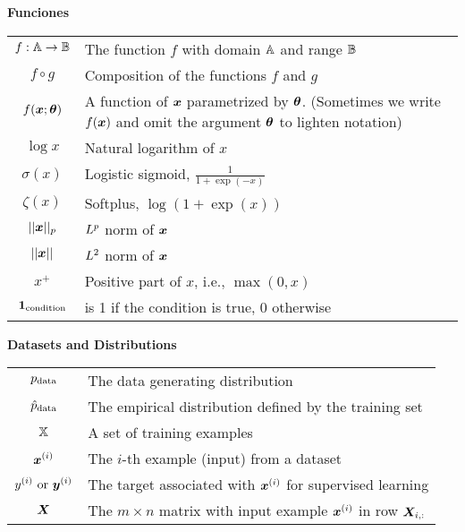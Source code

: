 \vspace{\notationgap}
\begin{minipage}{\textwidth}
\centerline{\bf Funciones}
\bgroup
\def\arraystretch{1.5}
\begin{tabular}{cp{}}
$\displaystyle f: {\mathbb{A}} \rightarrow {\mathbb{B}}$ & The function $f$ with domain ${\mathbb{A}}$ and range ${\mathbb{B}}$\\
$\displaystyle f \circ g $ & Composition of the functions $f$ and $g$ \\
  $\displaystyle f({\bm{x}} ; {\bm{\theta}}) $ & A function of ${\bm{x}}$ parametrized by ${\bm{\theta}}$.
  (Sometimes we write $f({\bm{x}})$ and omit the argument ${\bm{\theta}}$ to lighten notation) \\
$\displaystyle \log x$ & Natural logarithm of $x$ \\
$\displaystyle \sigma(x)$ & Logistic sigmoid, $\displaystyle \frac{1} {1 + \exp(-x)}$ \\
$\displaystyle \zeta(x)$ & Softplus, $\log(1 + \exp(x))$ \\
$\displaystyle || {\bm{x}} ||_p $ & $L^p$ norm of ${\bm{x}}$ \\
$\displaystyle || {\bm{x}} || $ & $L^2$ norm of ${\bm{x}}$ \\
$\displaystyle x^+$ & Positive part of $x$, i.e., $\max(0,x)$\\
$\displaystyle \bm{1}_\mathrm{condition}$ & is 1 if the condition is true, 0 otherwise\\
\end{tabular}
\egroup
{}
\end{minipage}



\vspace{\notationgap}
\begin{minipage}{\textwidth}
\centerline{\bf Datasets and Distributions}
\bgroup
\def\arraystretch{1.5}
\begin{tabular}{cp{}}
$\displaystyle p_{\rm{data}}$ & The data generating distribution\\
$\displaystyle \hat{p}_{\rm{data}}$ & The empirical distribution defined by the training set\\
$\displaystyle {\mathbb{X}}$ & A set of training examples\\
$\displaystyle {\bm{x}}^{(i)}$ & The $i$-th example (input) from a dataset\\
$\displaystyle y^{(i)}\text{ or }{\bm{y}}^{(i)}$ & The target associated with ${\bm{x}}^{(i)}$ for supervised learning\\
$\displaystyle {\bm{X}}$ & The $m \times n$ matrix with input example ${\bm{x}}^{(i)}$ in row ${\bm{X}}_{i,:}$\\
\end{tabular}
\egroup
\end{minipage}

\clearpage
